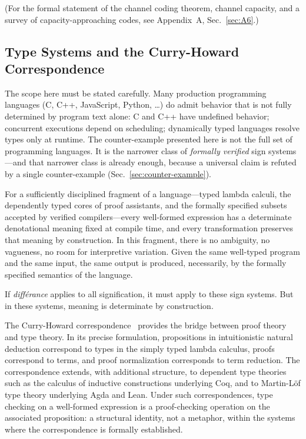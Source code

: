 \documentclass[a4paper,twocolumn,11pt]{article}
\begin{document}
(For the formal statement of the channel coding theorem, channel capacity, and a survey of capacity-approaching codes, see Appendix~A, Sec.~\ref{sec:A6}.)

\subsection{Type Systems and the Curry-Howard Correspondence}
\label{sec:types}

The scope here must be stated carefully. Many production programming languages (C, C++, JavaScript, Python, \ldots) do admit behavior that is not fully determined by program text alone: C and C++ have undefined behavior; concurrent executions depend on scheduling; dynamically typed languages resolve types only at runtime. The counter-example presented here is not the full set of programming languages. It is the narrower class of \emph{formally verified} sign systems---and that narrower class is already enough, because a universal claim is refuted by a single counter-example (Sec.~\ref{sec:counter-example}).

For a sufficiently disciplined fragment of a language---typed lambda calculi, the dependently typed cores of proof assistants, and the formally specified subsets accepted by verified compilers---every well-formed expression has a determinate denotational meaning fixed at compile time, and every transformation preserves that meaning by construction. In this fragment, there is no ambiguity, no vagueness, no room for interpretive variation. Given the same well-typed program and the same input, the same output is produced, necessarily, by the formally specified semantics of the language.

If \emph{diff\'erance} applies to all signification, it must apply to these sign systems. But in these systems, meaning is determinate by construction.

The Curry-Howard correspondence~\cite{Howard1980,Curry1958} provides the bridge between proof theory and type theory. In its precise formulation, propositions in intuitionistic natural deduction correspond to types in the simply typed lambda calculus, proofs correspond to terms, and proof normalization corresponds to term reduction. The correspondence extends, with additional structure, to dependent type theories such as the calculus of inductive constructions underlying Coq, and to Martin-L\"of type theory underlying Agda and Lean. Under such correspondences, type checking on a well-formed expression is a proof-checking operation on the associated proposition: a structural identity, not a metaphor, within the systems where the correspondence is formally established.
\end{document}
